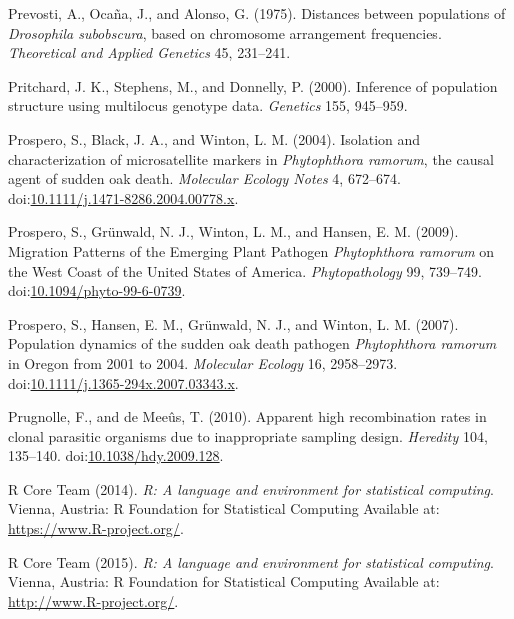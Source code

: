 \documentclass[double,12pt]{beavtex}
\begin{document}
  \hypertarget{ref-prevosti1975distances}{}
  Prevosti, A., Ocaña, J., and Alonso, G. (1975). Distances between
  populations of \emph{Drosophila subobscura}, based on chromosome
  arrangement frequencies. \emph{Theoretical and Applied Genetics} 45,
  231--241.
  
  \hypertarget{ref-pritchard2000inference}{}
  Pritchard, J. K., Stephens, M., and Donnelly, P. (2000). Inference of
  population structure using multilocus genotype data. \emph{Genetics}
  155, 945--959.
  
  \hypertarget{ref-prospero2004isolation}{}
  Prospero, S., Black, J. A., and Winton, L. M. (2004). Isolation and
  characterization of microsatellite markers in \emph{Phytophthora
  ramorum}, the causal agent of sudden oak death. \emph{Molecular Ecology
  Notes} 4, 672--674.
  doi:\href{https://doi.org/10.1111/j.1471-8286.2004.00778.x}{10.1111/j.1471-8286.2004.00778.x}.
  
  \hypertarget{ref-prospero2009migration}{}
  Prospero, S., Grünwald, N. J., Winton, L. M., and Hansen, E. M. (2009).
  Migration Patterns of the Emerging Plant Pathogen \emph{Phytophthora
  ramorum} on the West Coast of the United States of America.
  \emph{Phytopathology} 99, 739--749.
  doi:\href{https://doi.org/10.1094/phyto-99-6-0739}{10.1094/phyto-99-6-0739}.
  
  \hypertarget{ref-prospero2007population}{}
  Prospero, S., Hansen, E. M., Grünwald, N. J., and Winton, L. M. (2007).
  Population dynamics of the sudden oak death pathogen \emph{Phytophthora
  ramorum} in Oregon from 2001 to 2004. \emph{Molecular Ecology} 16,
  2958--2973.
  doi:\href{https://doi.org/10.1111/j.1365-294x.2007.03343.x}{10.1111/j.1365-294x.2007.03343.x}.
  
  \hypertarget{ref-prugnolle2010apparent}{}
  Prugnolle, F., and de Meeûs, T. (2010). Apparent high recombination
  rates in clonal parasitic organisms due to inappropriate sampling
  design. \emph{Heredity} 104, 135--140.
  doi:\href{https://doi.org/10.1038/hdy.2009.128}{10.1038/hdy.2009.128}.
  
  \hypertarget{ref-R2014}{}
  R Core Team (2014). \emph{R: A language and environment for statistical
  computing}. Vienna, Austria: R Foundation for Statistical Computing
  Available at: \url{https://www.R-project.org/}.
  
  \hypertarget{ref-R}{}
  R Core Team (2015). \emph{R: A language and environment for statistical
  computing}. Vienna, Austria: R Foundation for Statistical Computing
  Available at: \url{http://www.R-project.org/}.
  
\end{document}
